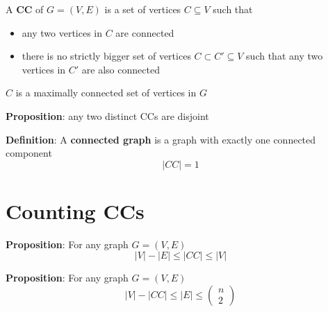 \begin{framed}
   A \textbf{CC} of $G = (V, E)$ is a set of vertices $C \subseteq V$ such that
   \begin{itemize}
      \item any two vertices in $C$ are connected 
      \item there is no strictly bigger set of vertices $C \subset C' \subseteq V$ such that any two vertices in $C'$ are also connected 
   \end{itemize}
   $C$  is a maximally connected set of vertices in $G$
\end{framed}

\begin{framed}
   \textbf{Proposition}: any two distinct CCs are disjoint
\end{framed}

\begin{framed}
   \textbf{Definition}: A \textbf{connected graph} is a graph with exactly one connected component
   \[
     |CC| = 1
   \] 
  
\end{framed}

\section{Counting CCs}
\begin{framed}
   \textbf{Proposition}: For any graph $G = (V, E)$
   \[
     |V| - |E| \leq |CC| \leq |V|
   \] 
\end{framed}

\begin{framed}
   \textbf{Proposition}: For any graph $G = (V, E)$
    \[
     |V| - |CC| \leq |E| \leq \begin{pmatrix} n \\2 \end{pmatrix} 
   \] 
\end{framed}






  















